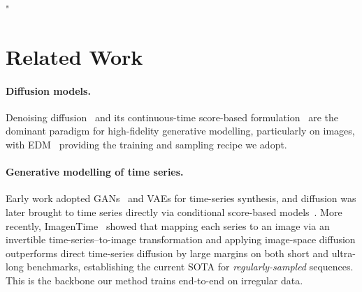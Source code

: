 "\documentclass{article}
\theoremstyle{plain}
\theoremstyle{definition}
\theoremstyle{remark}
\begin{document}
\vspace{-2mm}
\section{Related Work}
\label{sec:related}
\vspace{-1mm}

\paragraph{Diffusion models.}
Denoising diffusion~\citep{ho2020ddpm} and its continuous-time score-based formulation~\citep{song2021sde} are the dominant paradigm for high-fidelity generative modelling, particularly on images, with EDM~\citep{karras2022edm} providing the training and sampling recipe we adopt.

\paragraph{Generative modelling of time series.}
Early work adopted GANs~\citep{yoon2019timegan} and VAEs for time-series synthesis, and diffusion was later brought to time series directly via conditional score-based models~\citep{tashiro2021csdi}. More recently, ImagenTime~\citep{naiman2024imagentime} showed that mapping each series to an image via an invertible time-series--to-image transformation and applying image-space diffusion outperforms direct time-series diffusion by large margins on both short and ultra-long benchmarks, establishing the current SOTA for \emph{regularly-sampled} sequences. This is the backbone our method trains end-to-end on irregular data.
\end{document}
